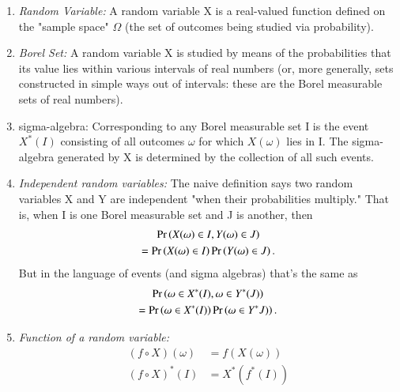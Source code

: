     \begin{definition}
        \begin{enumerate}
        \item {\em Random Variable:} A random variable X is a real-valued function defined on the "sample space" $\Omega$ (the set of outcomes being studied via probability).
        \item {\em Borel Set:} A random variable X is studied by means of the probabilities that its value lies within various intervals of real numbers (or, more generally, sets constructed in simple ways out of intervals: these are the Borel measurable sets of real numbers).         
        \item {sigma-algebra: }  Corresponding to any Borel measurable set I is the event $X^*(I)$ consisting of all outcomes $\omega$ for which $X(\omega)$ lies in I.
        The sigma-algebra generated by X is determined by the collection of all such events.
        \item {\em Independent random variables: } The naive definition says two random variables X and Y are independent "when their probabilities multiply." That is, when I is one Borel measurable set and J is another, then 
        \begin{multline}
            \Pr\left(X(\omega)\in I , Y(\omega)\in J\right)\\=\Pr\left(X(\omega)\in I\right)\Pr\left(Y(\omega)\in J\right).
        \end{multline}
        But in the language of events (and sigma algebras) that's the same as
        \begin{multline}
            \Pr\left(\omega \in X^*(I) , \omega \in Y^*(J)\right)\\=\Pr\left(\omega \in X^*(I)\right)\Pr\left(\omega \in Y^*J)\right).
        \end{multline}
        \item {\em Function of a random variable: }
        \begin{align}
            (f\circ X)(\omega)&=f(X(\omega))
            \\
            (f\circ X)^*(I)&=X^*(f^*(I))
            \label{eq:gauss/3/omega}
        \end{align}
        \end{enumerate}
    
    \end{definition}
    
